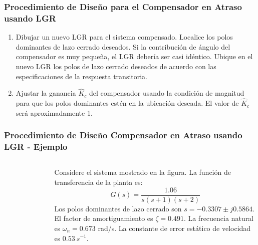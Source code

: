 \documentclass[aspectratio=169,handout]{beamer}
\theoremstyle{definition}
\theoremstyle{plain}
\theoremstyle{remark}
\newcounter{saveenumi}
\newcommand{\conti}{\setcounter{enumi}{\value{saveenumi}}}
\begin{document}
\begin{frame}[<+->]\frametitle{Procedimiento de Diseño para el Compensador en Atraso usando LGR}
	\begin{enumerate}
		\conti
		\item Dibujar un nuevo LGR para el sistema compensado. Localice los polos dominantes de lazo cerrado deseados. Si la contribución de ángulo del compensador es muy pequeña, el LGR debería ser casi idéntico. Ubique en el nuevo LGR los polos de lazo cerrado deseados de acuerdo con las especificaciones de la respuesta transitoria.
		\item Ajustar la ganancia $\hat{K}_c$ del compensador usando la condición de magnitud para que los polos dominantes estén en la ubicación deseada. El valor de $\hat{K}_c$ será aproximadamente 1.
	\end{enumerate}
\end{frame}


\begin{frame}[c]\frametitle{Procedimiento de Diseño Compensador en Atraso usando LGR - Ejemplo}
\begin{columns}
	\begin{column}{0.4\textwidth}
		\begin{figure}
			\includegraphics[width=4.5cm]{images/ejemplo2_planta.eps}
		\end{figure}
	\end{column}
	\begin{column}{0.6\textwidth}
		Considere el sistema mostrado en la figura. La función de transferencia de la planta es:
		\begin{equation*}
			G(s) = \frac{1.06}{s(s+1)(s+2)}
		\end{equation*}
		\pause	
		Los polos dominantes de lazo cerrado son $s = -0.3307 \pm j0.5864$. El factor de amortiguamiento es $\zeta = 0.491$. La frecuencia natural es $\omega_n = 0.673$ rad/s. La constante de error estático de velocidad es $0.53\ s^{-1}$.
	\end{column}
\end{columns}
\end{frame}
\end{document}
